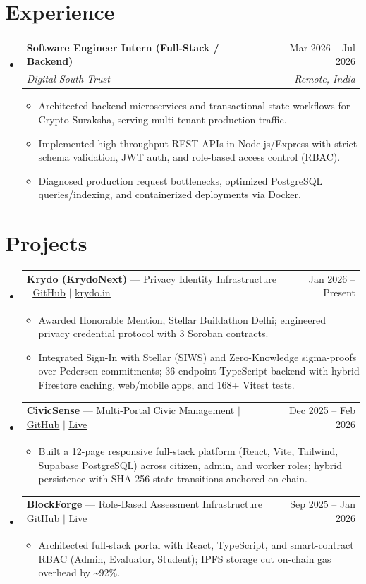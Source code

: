 \documentclass[letterpaper,11pt]{article}
\makeatletter
\newcommand{\resumeItem}[1]{
  \item\small{
    {#1 \vspace{-5pt}}
  }
}
\newcommand{\resumeSubheading}[4]{
  \vspace{-2pt}\item
    \begin{tabular*}{0.97\textwidth}[t]{l@{\extracolsep{\fill}}r}
      \textbf{#1} & #2 \\
      \textit{\small#3} & \textit{\small #4} \\
    \end{tabular*}\vspace{-9pt}
}
\newcommand{\resumeProjectHeading}[2]{
  \item
    \begin{tabular*}{0.97\textwidth}{l@{\extracolsep{\fill}}r}
      \small#1 & #2 \\
    \end{tabular*}\vspace{-9pt}
}
\newcommand{\resumeSubHeadingListStart}{\begin{itemize}[leftmargin=0.15in, label={}]}
\newcommand{\resumeSubHeadingListEnd}{\end{itemize}}
\newcommand{\resumeItemListStart}{\begin{itemize}}
\newcommand{\resumeItemListEnd}{\end{itemize}\vspace{-10pt}}
\makeatother
\begin{document}
\section{Experience}
  \resumeSubHeadingListStart
    \resumeSubheading
      {Software Engineer Intern (Full-Stack / Backend)}{Mar 2026 -- Jul 2026}
      {Digital South Trust}{Remote, India}
      \resumeItemListStart
        \resumeItem{Architected backend microservices and transactional state workflows for Crypto Suraksha, serving multi-tenant production traffic.}
        \resumeItem{Implemented high-throughput REST APIs in Node.js/Express with strict schema validation, JWT auth, and role-based access control (RBAC).}
        \resumeItem{Diagnosed production request bottlenecks, optimized PostgreSQL queries/indexing, and containerized deployments via Docker.}
      \resumeItemListEnd
  \resumeSubHeadingListEnd

\section{Projects}
  \resumeSubHeadingListStart
    \resumeProjectHeading
      {\textbf{Krydo (KrydoNext)} --- Privacy Identity Infrastructure $|$ \href{https://github.com/nishant-uxs/krydo-next}{\underline{GitHub}} $|$ \href{https://krydo.in}{\underline{krydo.in}}}{Jan 2026 -- Present}
      \resumeItemListStart
        \resumeItem{Awarded Honorable Mention, Stellar Buildathon Delhi; engineered privacy credential protocol with 3 Soroban contracts.}
        \resumeItem{Integrated Sign-In with Stellar (SIWS) and Zero-Knowledge sigma-proofs over Pedersen commitments; 36-endpoint TypeScript backend with hybrid Firestore caching, web/mobile apps, and 168+ Vitest tests.}
      \resumeItemListEnd
    \resumeProjectHeading
      {\textbf{CivicSense} --- Multi-Portal Civic Management $|$ \href{https://github.com/nishant-uxs/CivicSense}{\underline{GitHub}} $|$ \href{https://civic-sense-six.vercel.app}{\underline{Live}}}{Dec 2025 -- Feb 2026}
      \resumeItemListStart
        \resumeItem{Built a 12-page responsive full-stack platform (React, Vite, Tailwind, Supabase PostgreSQL) across citizen, admin, and worker roles; hybrid persistence with SHA-256 state transitions anchored on-chain.}
      \resumeItemListEnd
    \resumeProjectHeading
      {\textbf{BlockForge} --- Role-Based Assessment Infrastructure $|$ \href{https://github.com/nishant-uxs/labeval}{\underline{GitHub}} $|$ \href{https://blockchain-labeval.onrender.com}{\underline{Live}}}{Sep 2025 -- Jan 2026}
      \resumeItemListStart
        \resumeItem{Architected full-stack portal with React, TypeScript, and smart-contract RBAC (Admin, Evaluator, Student); IPFS storage cut on-chain gas overhead by \textasciitilde{}92\%.}
      \resumeItemListEnd
  \resumeSubHeadingListEnd
\end{document}
